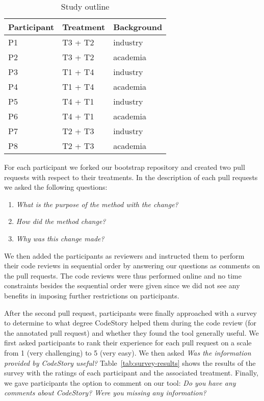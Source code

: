 \documentclass[../manifest.tex]{subfiles}
\begin{document}
\begin{table*}[t]
    \centering
    \begin{threeparttable}
    \begin{tabular*}{\textwidth}{lll}
    \hline
    \textbf{Participant} & \textbf{Treatment} & \textbf{Background} \\
    \hline
    P1 & T3 + T2 & industry \\
    P2 & T3 + T2 & academia \\
    P3 & T1 + T4 & industry \\
    P4 & T1 + T4 & academia \\
    P5 & T4 + T1 & industry \\
    P6 & T4 + T1 & academia \\
    P7 & T2 + T3 & industry \\
    P8 & T2 + T3 & academia \\
    \hline
    \end{tabular*}
    \end{threeparttable}
    \caption{Study outline}
    \label{tab:study-outline}
\end{table*}

For each participant we forked our bootstrap repository and created two pull requests with respect to their treatments. In the description of each pull requests we asked the following questions:
\begin{enumerate}
  \item \textit{What is the purpose of the method with the change?}
  \item \textit{How did the method change?}
  \item \textit{Why was this change made?}
\end{enumerate}

We then added the participants as reviewers and instructed them to perform their code reviews in sequential order by answering our questions as comments on the pull requests. The code reviews were thus performed online and no time constraints besides the sequential order were given since we did not see any benefits in imposing further restrictions on participants.

After the second pull request, participants were finally approached with a survey to determine to what degree CodeStory helped them during the code review (for the annotated pull request) and whether they found the tool generally useful. We first asked participants to rank their experience for each pull request on a scale from 1 (very challenging) to 5 (very easy). We then asked \textit{Was the information provided by CodeStory useful?} Table~\ref{tab:survey-results} shows the results of the survey with the ratings of each participant and the associated treatment. Finally, we gave participants the option to comment on our tool: \textit{Do you have any comments about CodeStory? Were you missing any information?}
\end{document}
